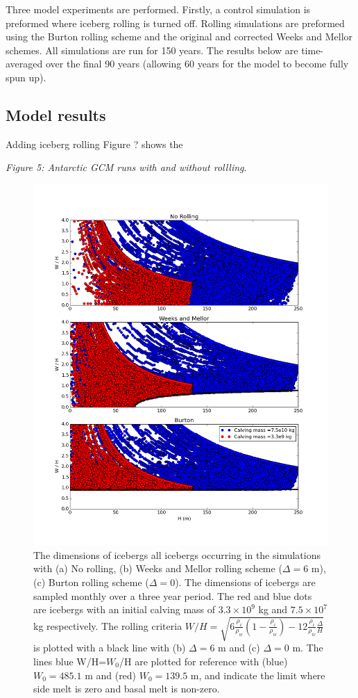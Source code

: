 \documentclass[twocol]{ametsoc_tw}
\newcommand{\ri}{\rho_i}
\newcommand{\rw}{\rho_w}
\begin{document}
Three model experiments are performed. Firstly, a control simulation is preformed where iceberg rolling is turned off. Rolling simulations are preformed using the Burton rolling scheme and the original and corrected Weeks and Mellor schemes. All simulations are run for 150 years. The results below are time-averaged over the final 90 years (allowing 60 years for the model to become fully spun up).
\subsection{Model results}
Adding iceberg rolling 
Figure  ? shows the 

\emph{Figure 5: Antarctic GCM runs with and without rollling}.


 \begin{figure}[!t]
 \begin{center}
 \hspace{-.5 cm} \includegraphics[width=.8\linewidth]{Figs/Berg_limits}
 \caption{The dimensions of icebergs all icebergs occurring in the simulations with (a) No rolling, (b) Weeks and Mellor rolling scheme ($\Delta=6$ m), (c) Burton rolling scheme ($\Delta =0$). The dimensions of icebergs are sampled monthly over a three year period. The red and blue dots are icebergs with an initial calving mass of $3.3 \times 10^{9}$ kg and   $7.5 \times 10^{7}$ kg respectively. The rolling criteria $W/H=\sqrt{6 \frac{\ri}{\rw}\left(1-\frac{\ri}{\rw}\right) -12\frac{\ri}{\rw} \frac{\Delta}{H}}$ is plotted with a black line with (b) $\Delta = 6$ m and (c) $\Delta = 0$ m.  The lines blue W/H=$W_{0}$/H are plotted for reference with (blue) $W_{0}=485.1$ m and (red) $W_{0}=139.5$ m, and indicate the limit where side melt is zero and basal melt is non-zero.}
 \label{fig:GCM_limits}
 \end{center}
\end{figure}
\end{document}
